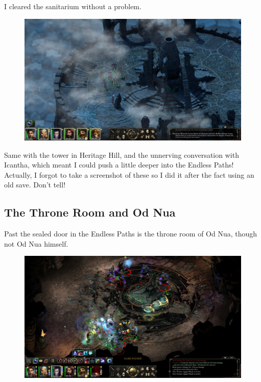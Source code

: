 \documentclass{article}
\begin{document}
I cleared the sanitarium without a problem.

\begin{figure}
\includegraphics[scale=0.33]{files/blog/2018_11_25_pillars_of_eternity_path_of_the_damned_act_ii/2018_11_25_teirnowneth.jpg}
\end{figure}

Same with the tower in Heritage Hill, and the unnerving conversation with Icantha, which meant I could push a little deeper into the Endless Paths!  Actually, I forgot to take a screenshot of these so I did it after the fact using an old save.  Don't tell!

\subsection{The Throne Room and Od Nua}
Past the sealed door in the Endless Paths is the throne room of Od Nua, though not Od Nua himself.

\begin{figure}
\includegraphics[scale=0.33]{files/blog/2018_11_25_pillars_of_eternity_path_of_the_damned_act_ii/2018_11_25_paths_l13_2.jpg}
\end{figure}
\end{document}
